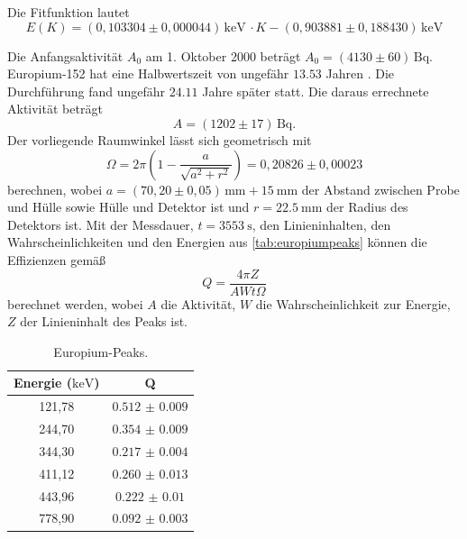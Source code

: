 Die Fitfunktion lautet
\begin{equation}
    E(K) = (0,103304 \pm 0,000044) \, \si{\kilo\electronvolt} \, \cdot K - (0,903881 \pm 0,188430) \, \si{\kilo\electronvolt}
    \label{eq:kanalenergie}
\end{equation}

Die Anfangsaktivität $A_0$ am 1. Oktober 2000 beträgt $A_0 = (4130 \pm 60) \, \si{\becquerel}$. Europium-152 hat eine Halbwertszeit von ungefähr $\num{13,53}$ Jahren \cite{hwz-eu}.
Die Durchführung fand ungefähr $\num{24,11}$ Jahre später statt.
Die daraus errechnete Aktivität beträgt
\begin{equation}
    A = (1202 \pm 17) \, \si{\becquerel}.
    \label{eq:aktivitätEu}
\end{equation}
Der vorliegende Raumwinkel lässt sich geometrisch mit
\begin{equation}
    \Omega = 2 \pi \left(1 - \frac{a}{\sqrt{a^2 + r^2}}\right) = 0,20826 \pm 0,00023
\end{equation}
berechnen, wobei $a = (70,20 \pm 0,05) \, \si{\milli\meter} + \SI{15}{\milli\meter}$ der Abstand zwischen Probe und Hülle sowie Hülle und Detektor ist und $r = \SI{22,5}{\milli\meter}$ der Radius des Detektors ist.
Mit der Messdauer, $t = \SI{3553}{\second}$, den Linieninhalten, den Wahrscheinlichkeiten und den Energien aus \autoref{tab:europiumpeaks} können
die Effizienzen gemäß
\begin{equation}
    Q = \frac{4 \pi Z}{A W t \Omega}
    \label{eq:effizienz}
\end{equation}
berechnet werden, wobei $A$ die Aktivität, $W$ die Wahrscheinlichkeit zur Energie, $Z$ der Linieninhalt des Peaks ist.

\begin{table}[H]
    \centering
    \caption{Europium-Peaks.}
    \label{tab:europiumeffizienz}
    \begin{tabular}{c c}
        \toprule
        {Energie ($\si{\kilo\electronvolt}$)} & {Q} \\
        \midrule
        121,78 & $\num{0.512(9)}$ \\
        244,70 & $\num{0.354(9)}$ \\
        344,30 & $\num{0.217(4)}$ \\
        411,12 & $\num{0.260(13)}$ \\
        443,96 & $\num{0.222(10)}$ \\
        778,90 & $\num{0.092(3)}$ \\
        \bottomrule
    \end{tabular}
\end{table}

